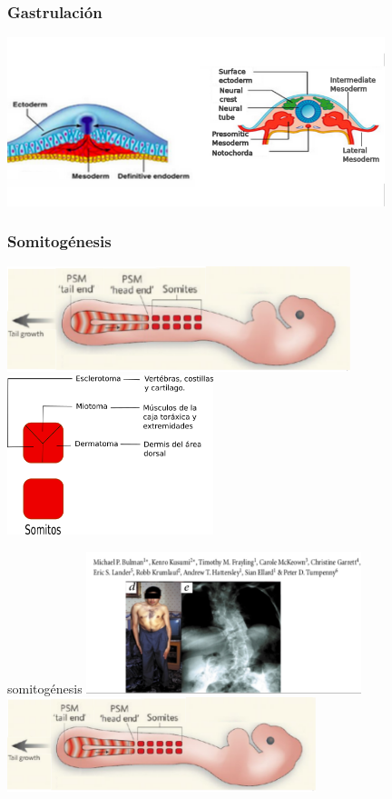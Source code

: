 \documentclass[xcolor=table, xllnames]{beamer}
\begin{document}
\begin{frame}
	\frametitle{Gastrulaci\'on}
	\centering
	\includegraphics[width=11cm]{Figuras/gastrulacion.png}
\end{frame}

\begin{frame}
	\frametitle{Somitog\'enesis}
	\centering
	\includegraphics[width=10cm]{Figuras/somitogenesis2inv.png} \pause \\[.1cm]
	\includegraphics[width=6cm]{Figuras/somito.png}
	
\end{frame}
\begin{frame}{somitog\'enesis}
	\centering
	\includegraphics[width=8cm]{Figuras/somitogenesis3.png} \\[.2cm]
	\pause
	\includegraphics[width=9cm]{Figuras/somitogenesis2inv.png}
\end{frame}	
\end{document}
